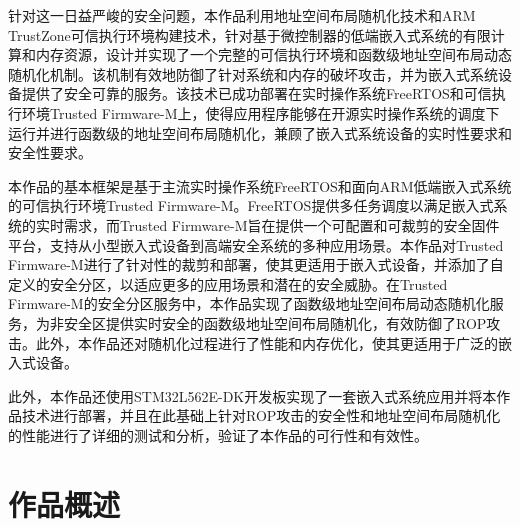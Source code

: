 \documentclass[UTF8,12pt,a4paper]{ctexart}
\numberwithin{figure}{section}
\begin{document}
\par 针对这一日益严峻的安全问题，本作品利用地址空间布局随机化技术和ARM TrustZone可信执行环境构建技术，针对基于微控制器的低端嵌入式系统的有限计算和内存资源，设计并实现了一个完整的可信执行环境和函数级地址空间布局动态随机化机制。该机制有效地防御了针对系统和内存的破坏攻击，并为嵌入式系统设备提供了安全可靠的服务。该技术已成功部署在实时操作系统FreeRTOS和可信执行环境Trusted Firmware-M上，使得应用程序能够在开源实时操作系统的调度下运行并进行函数级的地址空间布局随机化，兼顾了嵌入式系统设备的实时性要求和安全性要求。

\par 本作品的基本框架是基于主流实时操作系统FreeRTOS和面向ARM低端嵌入式系统的可信执行环境Trusted Firmware-M。FreeRTOS提供多任务调度以满足嵌入式系统的实时需求，而Trusted Firmware-M旨在提供一个可配置和可裁剪的安全固件平台，支持从小型嵌入式设备到高端安全系统的多种应用场景。本作品对Trusted Firmware-M进行了针对性的裁剪和部署，使其更适用于嵌入式设备，并添加了自定义的安全分区，以适应更多的应用场景和潜在的安全威胁。在Trusted Firmware-M的安全分区服务中，本作品实现了函数级地址空间布局动态随机化服务，为非安全区提供实时安全的函数级地址空间布局随机化，有效防御了ROP攻击。此外，本作品还对随机化过程进行了性能和内存优化，使其更适用于广泛的嵌入式设备。

\par 此外，本作品还使用STM32L562E-DK开发板实现了一套嵌入式系统应用并将本作品技术进行部署，并且在此基础上针对ROP攻击的安全性和地址空间布局随机化的性能进行了详细的测试和分析，验证了本作品的可行性和有效性。
\clearpage
\pagestyle{articleStyle}
\section{作品概述}
\end{document}
